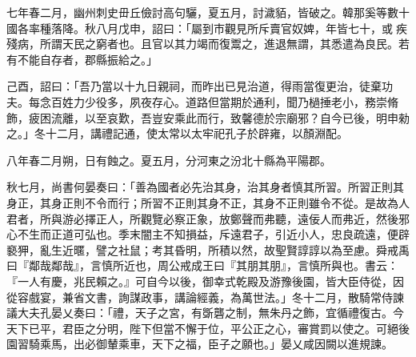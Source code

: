 \begin{pinyinscope}
 
七年春二月，幽州刺史毌丘儉討高句驪，夏五月，討濊貊，皆破之。韓那奚等數十國各率種落降。秋八月戊申，詔曰：「屬到巿觀見所斥賣官奴婢，年皆七十，或𤸇疾殘病，所謂天民之窮者也。且官以其力竭而復鬻之，進退無謂，其悉遣為良民。若有不能自存者，郡縣振給之。」
 
 
己酉，詔曰：「吾乃當以十九日親祠，而昨出已見治道，得雨當復更治，徒棄功夫。每念百姓力少役多，夙夜存心。道路但當期於通利，聞乃檛捶老小，務崇脩飾，疲困流離，以至哀歎，吾豈安乘此而行，致馨德於宗廟邪？自今已後，明申勑之。」冬十二月，講禮記通，使太常以太牢祀孔子於辟雍，以顏淵配。
 
 
 
 
 八年春二月朔，日有蝕之。夏五月，分河東之汾北十縣為平陽郡。
 
 
 
 
 秋七月，尚書何晏奏曰：「善為國者必先治其身，治其身者慎其所習。所習正則其身正，其身正則不令而行；所習不正則其身不正，其身不正則雖令不從。是故為人君者，所與游必擇正人，所觀覽必察正象，放鄭聲而弗聽，遠佞人而弗近，然後邪心不生而正道可弘也。季末闇主不知損益，斥遠君子，引近小人，忠良疏遠，便辟褻狎，亂生近暱，譬之社鼠；考其昏明，所積以然，故聖賢諄諄以為至慮。舜戒禹曰『鄰哉鄰哉』，言慎所近也，周公戒成王曰『其朋其朋』，言慎所與也。書云：『一人有慶，兆民賴之。』可自今以後，御幸式乾殿及游豫後園，皆大臣侍從，因從容戲宴，兼省文書，詢謀政事，講論經義，為萬世法。」冬十二月，散騎常侍諫議大夫孔晏乂奏曰：「禮，天子之宮，有斲礱之制，無朱丹之飾，宜循禮復古。今天下已平，君臣之分明，陛下但當不懈于位，平公正之心，審賞罰以使之。可絕後園習騎乘馬，出必御輦乘車，天下之福，臣子之願也。」晏乂咸因闕以進規諫。
 

\end{pinyinscope}
